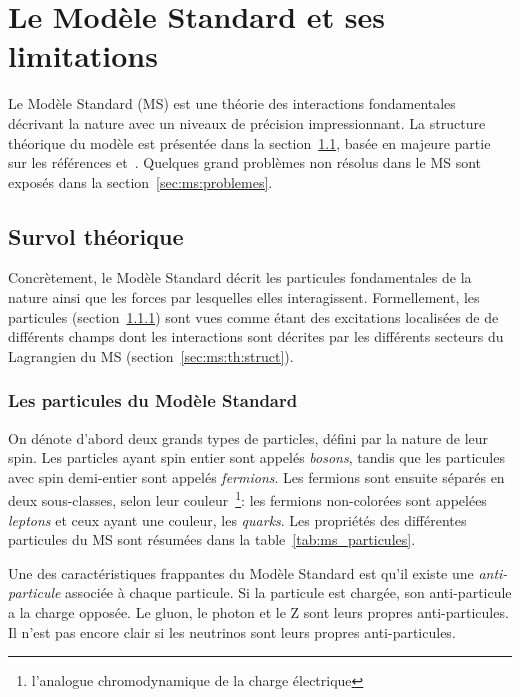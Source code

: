 \chapter{Le Modèle Standard et ses limitations}
\label{sec:ms}

Le Modèle Standard (MS) est une théorie des interactions fondamentales
décrivant la nature avec un niveaux de précision impressionnant.
La structure théorique du modèle est présentée dans la
section~\ref{sec:ms:th}, basée en majeure partie sur les références
\cite{olive_review_2014} et~\cite{thomson_modern_2013}. Quelques grand
problèmes non résolus dans le MS sont exposés dans la
section~\ref{sec:ms:problemes}.

\section{Survol théorique}
\label{sec:ms:th}

Concrètement, le Modèle Standard décrit les particules fondamentales
de la nature ainsi que les forces par lesquelles elles
interagissent. Formellement, les particules
(section~\ref{sec:ms:th:particules}) sont vues comme étant des
excitations localisées de de différents champs dont les interactions
sont décrites par les différents secteurs du Lagrangien du MS
(section~\ref{sec:ms:th:struct}).

\subsection{Les particules du Modèle Standard}
\label{sec:ms:th:particules}

On dénote d'abord deux grands types de particles, défini par la nature
de leur spin. Les particles ayant spin entier sont appelés
\emph{bosons}, tandis que les particules avec spin demi-entier sont
appelés \emph{fermions}. Les fermions sont ensuite séparés en deux
sous-classes, selon leur couleur~\footnote{l'analogue chromodynamique
  de la charge électrique}: les fermions non-colorées sont appelées
\emph{leptons} et ceux ayant une couleur, les \emph{quarks}. Les
propriétés des différentes particules du MS sont résumées dans la
table~\ref{tab:ms_particules}.

Une des caractéristiques frappantes du Modèle Standard est qu'il existe
une \emph{anti-particule} associée à chaque particule. Si la particule
est chargée, son anti-particule a la charge opposée. Le gluon, le
photon et le Z sont leurs propres anti-particules. Il n'est pas encore
clair si les neutrinos sont leurs propres anti-particules.

